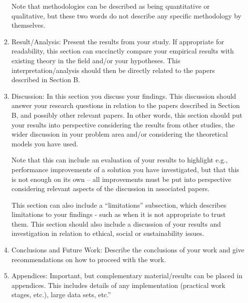 \documentclass[12pt,openany]{book}
\begin{document}
\begin{enumerate}
     Note that methodologies can be described as being quantitative or qualitative, but these two words do not describe any specific methodology by themselves.
     \item Result/Analysis: Present the results from your study. If appropriate for readability, this section can succinctly compare your empirical results with existing theory in the field and/or your hypotheses. This interpretation/analysis should then be directly related to the papers described in Section B.
     \item Discussion: In this section you discuss your findings. This discussion should answer your research questions in relation to the papers described in Section B, and possibly other relevant papers. In other words, this section should put your results into perspective considering the results from other studies, the wider discussion in your problem area and/or considering the theoretical models you have used.

      Note that this can include an evaluation of your results to highlight e.g., performance improvements of a solution you have investigated, but that this is not enough on its own – all improvements must be put into perspective considering relevant aspects of the discussion in associated papers.

      This section can also include a “limitations” subsection, which describes limitations to your findings - such as when it is not appropriate to trust them. This section should also include a discussion of your results and investigation in relation to ethical, social or sustainability issues.
      \item Conclusions and Future Work: Describe the conclusions of your work and give recommendations on how to proceed with the work.
      \item Appendices: Important, but complementary material/results can be placed in appendices. This includes details of any implementation (practical work stages, etc.), large data sets, etc.”
 \end{enumerate}
\end{document}
